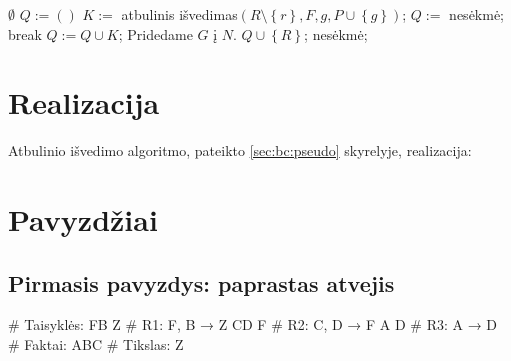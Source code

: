 \begin{algorithmic}[1]
     \label{bc:pseudo:goal_in_facts}
      \State \Return $\emptyset$ \label{bc:pseudo:emptyset}
    \Else
       \label{bc:pseudo:rule_iter}
        \State $Q := \left( \right)$ \label{bc:pseudo:initial_Q}
         \label{bc:pseudo:premise_iter}
          \State $K := $ atbulinis išvedimas$(%
            R\setminus \left\{ r \right\}, F, g,%
            P \cup \left\{ g \right\})$; \label{bc:pseudo:recursion}
           \label{bc:pseudo:rule:fail}
            \State $Q :=$ nesėkmė;
            \State break
          \Else \label{bc:pseudo:rule:success}
            \State $Q := Q \cup K$;
          \EndIf
           \label{bc:pseudo:success}
            \State Pridedame $G$ į $N$. \label{bc:pseudo:add_fact}
            \State \Return $Q \cup \left\{ R \right\}$;%
              \label{bc:pseudo:return_succ}
          \EndIf
        \EndFor
      \EndFor
      \State \Return nesėkmė; \label{bc:pseudo:failure}
    \EndIf
  \EndFunction
\end{algorithmic}

\section{Realizacija}

Atbulinio išvedimo algoritmo, pateikto \ref{sec:bc:pseudo}
skyrelyje, realizacija:


\section{Pavyzdžiai}

\subsection{Pirmasis pavyzdys: paprastas atvejis}

\begin{pythonaienv}[bc]
# Taisyklės:
FB Z                                    # R1: F, B → Z
CD F                                    # R2: C, D → F
A D                                     # R3: A → D
# Faktai:
ABC
# Tikslas:
Z
\end{pythonaienv}

